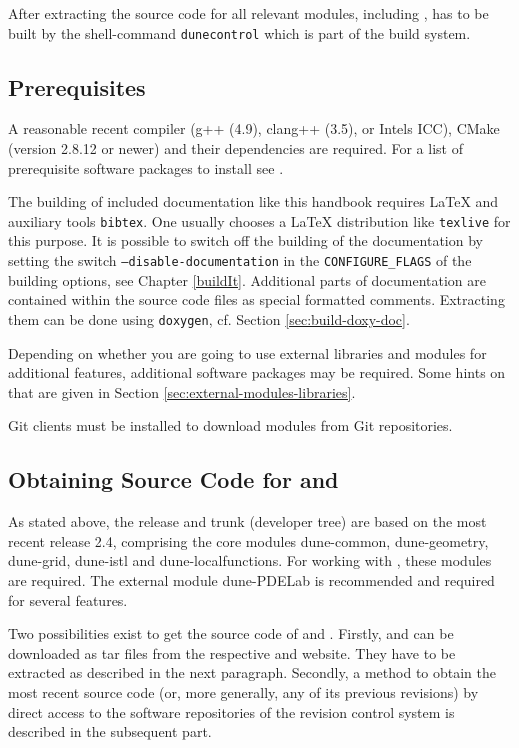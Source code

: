 After extracting the source code for all relevant \Dune modules, including \Dumux, \Dune has to be built
by the shell-command \texttt{dunecontrol} which is part of the \Dune build system.

\subsection{Prerequisites} \label{sec:prerequisites}
A reasonable recent \Cplusplus compiler (g++ (4.9), clang++ (3.5), or Intels ICC), CMake (version 2.8.12 or newer) and their
dependencies are required.
For a list of prerequisite software packages to install see \cite{DUNE-WIKI-PREREQUISITE-SOFTWARE}.

The building of included documentation like this handbook requires \LaTeX{} and auxiliary tools
\texttt{bibtex}. One usually chooses a \LaTeX{} distribution like \texttt{texlive} for this purpose.
It is possible to switch off the building of the documentation by setting the switch \texttt{--disable-documentation}
in the \texttt{CONFIGURE\_FLAGS} of the building options, see Chapter \ref{buildIt}.
Additional parts of documentation are contained within the source code files as special formatted comments.
Extracting them can be done using \texttt{doxygen}, cf. Section \ref{sec:build-doxy-doc}.

Depending on whether you are going to use external libraries and modules for additional \Dune features,
additional software packages may be required. Some hints on that are given in Section \ref{sec:external-modules-libraries}.

Git clients must be installed to download modules from Git repositories.

\subsection{Obtaining Source Code for \Dune and \Dumux}
As stated above, the \Dumux release and trunk (developer tree) are based on the most recent
\Dune release 2.4, comprising the core modules dune-common, dune-geometry, dune-grid,
dune-istl and dune-localfunctions. For working with \Dumux, these modules are required. The
external module dune-PDELab is recommended and required for several \Dumux features.

Two possibilities exist to get the source code of \Dune and \Dumux.
Firstly, \Dune and \Dumux can be downloaded as tar files from the respective \Dune and \Dumux website.
They have to be extracted as described in the next paragraph.
Secondly, a method to obtain the most recent source code (or, more generally, any of its previous revisions) by direct access
to the software repositories of the revision control system is described in the subsequent part.

